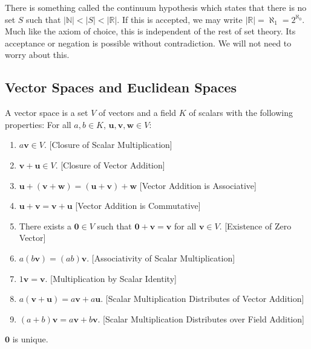 \documentclass[crop=false,class=article,oneside]{standalone}
\begin{document}
            \begin{remark}
            There is something called the continuum hypothesis which states that there is no set $S$ such that $|\mathbb{N}| < |S| < |\mathbb{R}|$. If this is accepted, we may write $|\mathbb{R}| = \aleph_1 = 2^{\aleph_0}$. Much like the axiom of choice, this is independent of the rest of set theory. Its acceptance or negation is possible without contradiction. We will not need to worry about this.
            \end{remark}
        \subsection{Vector Spaces and Euclidean Spaces}
            \begin{definition}
            A vector space is a set $V$ of vectors and a field $K$ of scalars with the following properties: For all $a,b\in K$, $\mathbf{u,v,w}\in V$:
            \begin{enumerate}
                \item $a\mathbf{v} \in V$. \hfill [Closure of Scalar Multiplication]
                \item $\mathbf{v}+\mathbf{u} \in V$. \hfill [Closure of Vector Addition]
                \item $\mathbf{u}+(\mathbf{v}+\mathbf{w}) = (\mathbf{u}+\mathbf{v})+\mathbf{w}$ \hfill [Vector Addition is Associative]
                \item $\mathbf{u}+\mathbf{v}=\mathbf{v}+\mathbf{u}$ \hfill [Vector Addition is Commutative]
                \item There exists a $\mathbf{0}\in V$ such that $\mathbf{0}+\mathbf{v}=\mathbf{v}$ for all $\mathbf{v}\in V$. \hfill [Existence of Zero Vector]
                \item $a(b\mathbf{v}) = (ab)\mathbf{v}$. \hfill [Associativity of Scalar Multiplication]
                \item $1 \mathbf{v} = \mathbf{v}$. \hfill[Multiplication by Scalar Identity]
                \item $a(\mathbf{v}+\mathbf{u}) = a\mathbf{v}+a\mathbf{u}$. \hfill [Scalar Multiplication Distributes of Vector Addition]
                \item $(a+b)\mathbf{v}= a\mathbf{v}+b\mathbf{v}$. \hfill [Scalar Multiplication Distributes over Field Addition]
            \end{enumerate}
            \end{definition}
            \begin{theorem}
            $\mathbf{0}$ is unique.
            \end{theorem}
\end{document}
